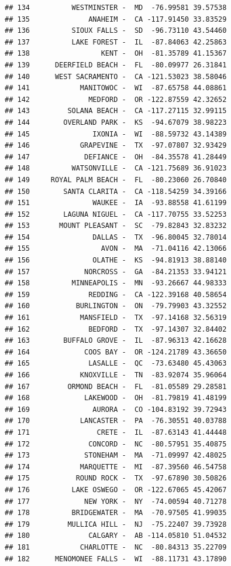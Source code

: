 \documentclass{article}\usepackage[]{graphicx}\usepackage[]{color}
\makeatletter
\newenvironment{kframe}{%
 \def\at@end@of@kframe{}%
 \ifinner\ifhmode%
  \def\at@end@of@kframe{\end{minipage}}%
  \begin{minipage}{\columnwidth}%
 \fi\fi%
 \def\FrameCommand##1{\hskip\@totalleftmargin \hskip-\fboxsep
 \colorbox{shadecolor}{##1}\hskip-\fboxsep
     \hskip-\linewidth \hskip-\@totalleftmargin \hskip\columnwidth}%
 \MakeFramed {\advance\hsize-\width
   \@totalleftmargin\z@ \linewidth\hsize
   \@setminipage}}%
 {\par\unskip\endMakeFramed%
 \at@end@of@kframe}
\newenvironment{knitrout}{}{} %
\makeatother
\begin{document}
\begin{knitrout}
\begin{kframe}
\begin{verbatim}
## 134          WESTMINSTER -  MD  -76.99581 39.57538
## 135              ANAHEIM -  CA -117.91450 33.83529
## 136          SIOUX FALLS -  SD  -96.73110 43.54460
## 137          LAKE FOREST -  IL  -87.84063 42.25863
## 138                 KENT -  OH  -81.35789 41.15367
## 139      DEERFIELD BEACH -  FL  -80.09977 26.31841
## 140      WEST SACRAMENTO -  CA -121.53023 38.58046
## 141            MANITOWOC -  WI  -87.65758 44.08861
## 142              MEDFORD -  OR -122.87559 42.32652
## 143         SOLANA BEACH -  CA -117.27115 32.99115
## 144        OVERLAND PARK -  KS  -94.67079 38.98223
## 145               IXONIA -  WI  -88.59732 43.14389
## 146            GRAPEVINE -  TX  -97.07807 32.93429
## 147             DEFIANCE -  OH  -84.35578 41.28449
## 148          WATSONVILLE -  CA -121.75689 36.91023
## 149     ROYAL PALM BEACH -  FL  -80.23060 26.70840
## 150        SANTA CLARITA -  CA -118.54259 34.39166
## 151               WAUKEE -  IA  -93.88558 41.61199
## 152        LAGUNA NIGUEL -  CA -117.70755 33.52253
## 153       MOUNT PLEASANT -  SC  -79.82843 32.83232
## 154               DALLAS -  TX  -96.80045 32.78014
## 155                 AVON -  MA  -71.04116 42.13066
## 156               OLATHE -  KS  -94.81913 38.88140
## 157             NORCROSS -  GA  -84.21353 33.94121
## 158          MINNEAPOLIS -  MN  -93.26667 44.98333
## 159              REDDING -  CA -122.39168 40.58654
## 160           BURLINGTON -  ON  -79.79903 43.32552
## 161            MANSFIELD -  TX  -97.14168 32.56319
## 162              BEDFORD -  TX  -97.14307 32.84402
## 163        BUFFALO GROVE -  IL  -87.96313 42.16628
## 164             COOS BAY -  OR -124.21789 43.36650
## 165              LASALLE -  QC  -73.63480 45.43063
## 166            KNOXVILLE -  TN  -83.92074 35.96064
## 167         ORMOND BEACH -  FL  -81.05589 29.28581
## 168             LAKEWOOD -  OH  -81.79819 41.48199
## 169               AURORA -  CO -104.83192 39.72943
## 170            LANCASTER -  PA  -76.30551 40.03788
## 171                CRETE -  IL  -87.63143 41.44448
## 172              CONCORD -  NC  -80.57951 35.40875
## 173             STONEHAM -  MA  -71.09997 42.48025
## 174            MARQUETTE -  MI  -87.39560 46.54758
## 175           ROUND ROCK -  TX  -97.67890 30.50826
## 176          LAKE OSWEGO -  OR -122.67065 45.42067
## 177             NEW YORK -  NY  -74.00594 40.71278
## 178          BRIDGEWATER -  MA  -70.97505 41.99035
## 179         MULLICA HILL -  NJ  -75.22407 39.73928
## 180              CALGARY -  AB -114.05810 51.04532
## 181            CHARLOTTE -  NC  -80.84313 35.22709
## 182      MENOMONEE FALLS -  WI  -88.11731 43.17890

\end{verbatim}
\end{kframe}
\end{knitrout}
\end{document}
